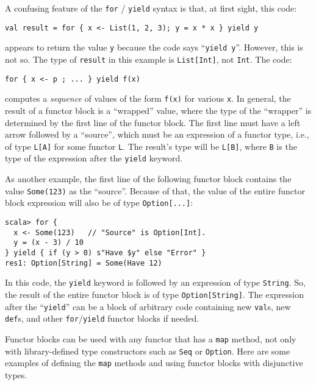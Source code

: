 A confusing feature of the \lstinline!for! / \lstinline!yield! syntax
is that, at first sight, this code:
\begin{lstlisting}
val result = for { x <- List(1, 2, 3); y = x * x } yield y
\end{lstlisting}
appears to return the value \lstinline!y! because the code says \textsf{``}\lstinline!yield y!\textsf{''}.
However, this is not so. The type of \lstinline!result! in this example
is \lstinline!List[Int]!, not \lstinline!Int!. The code:
\begin{lstlisting}
for { x <- p ; ... } yield f(x)
\end{lstlisting}
computes a \emph{sequence} of values of the form \lstinline!f(x)!
for various \lstinline!x!. In general, the result of a functor block
is a \textsf{``}wrapped\textsf{''} value, where the type of the \textsf{``}wrapper\textsf{''} is determined
by the first line of the functor block. The first line must have a
left arrow followed by a \textsf{``}source\textsf{''},
which must be an expression of a functor type, i.e., of type \lstinline!L[A]!
for some functor \lstinline!L!. The result\textsf{'}s type will be \lstinline!L[B]!,
where \lstinline!B! is the type of the expression after the \lstinline!yield!
keyword.

As another example, the first line of the following functor block
contains the value \lstinline!Some(123)! as the \textsf{``}source\textsf{''}. Because
of that, the value of the entire functor block expression will also
be of type \lstinline!Option[...]!:
\begin{lstlisting}
scala> for {
  x <- Some(123)   // "Source" is Option[Int].
  y = (x - 3) / 10
} yield { if (y > 0) s"Have $y" else "Error" }
res1: Option[String] = Some(Have 12)
\end{lstlisting}
In this code, the \lstinline!yield! keyword is followed by an expression
of type \lstinline!String!. So, the result of the entire functor
block is of type \lstinline!Option[String]!. The expression after
the \textsf{``}\lstinline!yield!\textsf{''} can be a block of arbitrary code containing
new \lstinline!val!s, new \lstinline!def!s, and other \lstinline!for!/\lstinline!yield!
functor blocks if needed.

Functor blocks can be used with any functor that has a \lstinline!map!
method, not only with library-defined type constructors such as \lstinline!Seq!
or \lstinline!Option!. Here are some examples of defining the \lstinline!map!
methods and using functor blocks with disjunctive types.


